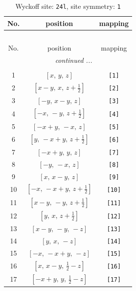 \documentclass[fleqn,8pt]{jsarticle}
\begin{document}
\begin{longtable}{ccc}
\caption{Wyckoff site: {\tt 24l}, site symmetry: {\tt 1}}
 \\
 \hline \hline
No. & position & mapping \\ \hline \endfirsthead

\multicolumn{2}{l}{\tablename\ \thetable{}} \\
 \hline \hline
No. & position & mapping \\ \hline \endhead

 \hline \hline
\multicolumn{2}{r}{\footnotesize\it continued ...} \\ \endfoot

 \hline \hline
\multicolumn{2}{r}{} \\ \endlastfoot

1 & $\left[ x,\, y,\, z \right]$ & {\tt [1]} \\ \hline
2 & $\left[ x - y,\, x,\, z + \frac{1}{2} \right]$ & {\tt [2]} \\ \hline
3 & $\left[ - y,\, x - y,\, z \right]$ & {\tt [3]} \\ \hline
4 & $\left[ - x,\, - y,\, z + \frac{1}{2} \right]$ & {\tt [4]} \\ \hline
5 & $\left[ - x + y,\, - x,\, z \right]$ & {\tt [5]} \\ \hline
6 & $\left[ y,\, - x + y,\, z + \frac{1}{2} \right]$ & {\tt [6]} \\ \hline
7 & $\left[ - x + y,\, y,\, z \right]$ & {\tt [7]} \\ \hline
8 & $\left[ - y,\, - x,\, z \right]$ & {\tt [8]} \\ \hline
9 & $\left[ x,\, x - y,\, z \right]$ & {\tt [9]} \\ \hline
10 & $\left[ - x,\, - x + y,\, z + \frac{1}{2} \right]$ & {\tt [10]} \\ \hline
11 & $\left[ x - y,\, - y,\, z + \frac{1}{2} \right]$ & {\tt [11]} \\ \hline
12 & $\left[ y,\, x,\, z + \frac{1}{2} \right]$ & {\tt [12]} \\ \hline
13 & $\left[ x - y,\, - y,\, - z \right]$ & {\tt [13]} \\ \hline
14 & $\left[ y,\, x,\, - z \right]$ & {\tt [14]} \\ \hline
15 & $\left[ - x,\, - x + y,\, - z \right]$ & {\tt [15]} \\ \hline
16 & $\left[ x,\, x - y,\, \frac{1}{2} - z \right]$ & {\tt [16]} \\ \hline
17 & $\left[ - x + y,\, y,\, \frac{1}{2} - z \right]$ & {\tt [17]} \\ \hline

\end{longtable}
\end{document}
